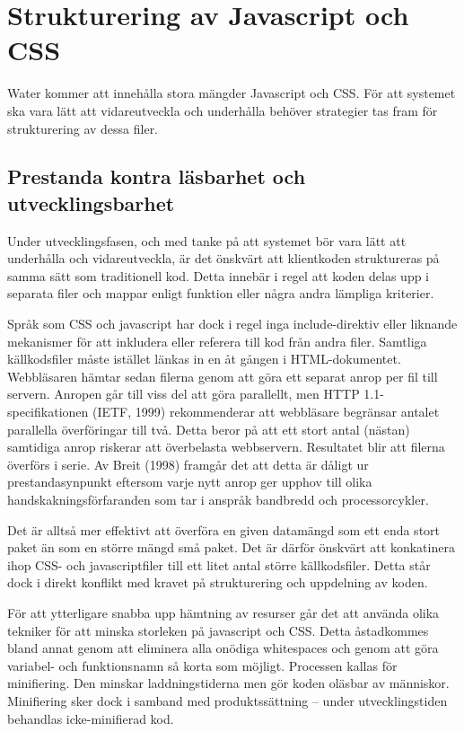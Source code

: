 \section{Strukturering av Javascript och CSS}

Water kommer att innehålla stora mängder Javascript och CSS. För att systemet ska vara lätt att vidareutveckla och underhålla behöver strategier tas fram för strukturering av dessa filer.

\subsection{Prestanda kontra läsbarhet och utvecklingsbarhet}

Under utvecklingsfasen, och med tanke på att systemet bör vara lätt att underhålla och vidareutveckla, är det önskvärt att klientkoden struktureras på samma sätt som traditionell kod. Detta innebär i regel att koden delas upp i separata filer och mappar enligt funktion eller några andra lämpliga kriterier.

Språk som CSS och javascript har dock i regel inga include-direktiv eller liknande mekanismer för att inkludera eller referera till kod från andra filer. Samtliga källkodsfiler måste istället länkas in en åt gången i HTML-dokumentet. 
Webbläsaren hämtar sedan filerna genom att göra ett separat anrop per fil till servern. Anropen går till viss del att göra parallellt, men HTTP 1.1-specifikationen (IETF, 1999) rekommenderar att webbläsare begränsar antalet parallella överföringar till två. Detta beror på att ett stort antal (nästan) samtidiga anrop riskerar att överbelasta webbservern. Resultatet blir att filerna överförs i serie. Av Breit (1998) framgår det att detta är dåligt ur prestandasynpunkt eftersom varje nytt anrop ger upphov till olika handskakningsförfaranden som tar i anspråk bandbredd och processorcykler. 

Det är alltså mer effektivt att överföra en given datamängd som ett enda stort paket än som en större mängd små paket. Det är därför önskvärt att konkatinera ihop CSS- och javascriptfiler till ett litet antal större källkodsfiler. Detta står dock i direkt konflikt med kravet på strukturering och uppdelning av koden.

För att ytterligare snabba upp hämtning av resurser går det att använda olika tekniker för att minska storleken på javascript och CSS. Detta åstadkommes bland annat genom att eliminera alla onödiga whitespaces och genom att göra variabel- och funktionsnamn så korta som möjligt. Processen kallas för minifiering. Den minskar laddningstiderna men gör koden oläsbar av människor. Minifiering sker dock i samband med produktssättning – under utvecklingstiden behandlas icke-minifierad kod.

